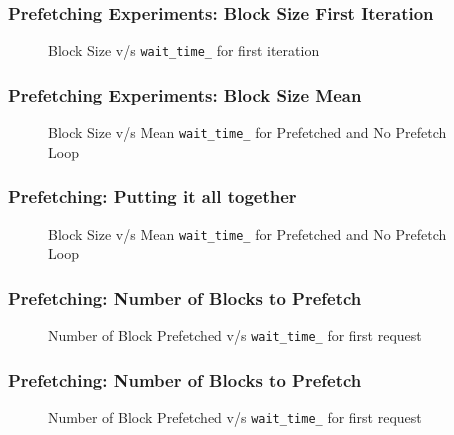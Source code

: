 \documentclass{beamer}
\begin{document}
\begin{frame}\frametitle{Prefetching Experiments: Block Size First Iteration}
  \begin{figure}[h]
    \resizebox{.9\linewidth}{!}{}
    \caption{Block Size v/s \texttt{wait\_time\_} for first iteration}
  \end{figure}
\end{frame}

\begin{frame}\frametitle{Prefetching Experiments: Block Size Mean}
  \begin{figure}[h]
    \resizebox{.9\linewidth}{!}{}
    \caption{Block Size v/s Mean \texttt{wait\_time\_} for Prefetched and No Prefetch Loop}
  \end{figure}
\end{frame}

\begin{frame}\frametitle{Prefetching: Putting it all together}
  \begin{figure}[h]
    \resizebox{.9\linewidth}{!}{}
    \caption{Block Size v/s Mean \texttt{wait\_time\_} for Prefetched and No Prefetch Loop}
  \end{figure}
\end{frame}

\begin{frame}\frametitle{Prefetching: Number of Blocks to Prefetch}
  \begin{figure}[h]
    \resizebox{.9\linewidth}{!}{}
    \caption{Number of Block Prefetched v/s \texttt{wait\_time\_} for first request}
  \end{figure}

\end{frame}

\begin{frame}\frametitle{Prefetching: Number of Blocks to Prefetch}
  \begin{figure}[h]
    \resizebox{.9\linewidth}{!}{}
    \caption{Number of Block Prefetched v/s \texttt{wait\_time\_} for first request}
  \end{figure}
\end{frame}
\end{document}
